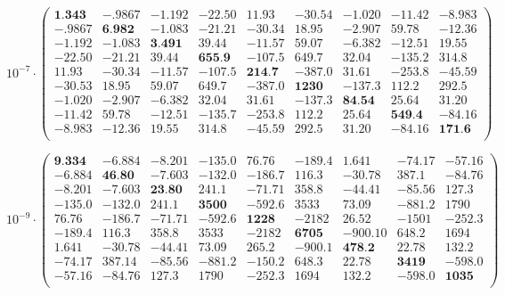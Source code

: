 \documentclass[a4paper,14pt]{extbook}
\begin{document}
\tiny
\begin{equation}\label{cov_1MHz}
10^{-7} \cdot \left(
\begin{array}{ccccccccc}
\textbf{1.343} & -.9867 & -1.192 & -22.50 & 11.93 & -30.54 & -1.020 & -11.42 & -8.983 \\
 -.9867 & \textbf{6.982} & -1.083 & -21.21 & -30.34 & 18.95 & -2.907 & 59.78 & -12.36 \\
 -1.192 & -1.083 & \textbf{3.491} & 39.44 & -11.57 & 59.07 & -6.382 & -12.51 & 19.55 \\
 -22.50 & -21.21 & 39.44 & \textbf{655.9} & -107.5 & 649.7 & 32.04 & -135.2 & 314.8 \\
 11.93 & -30.34 & -11.57 & -107.5 & \textbf{214.7} & -387.0 & 31.61 & -253.8 & -45.59 \\
 -30.53 & 18.95 & 59.07 & 649.7 & -387.0 & \textbf{1230} & -137.3 & 112.2 & 292.5 \\
 -1.020 & -2.907 & -6.382 & 32.04 & 31.61 & -137.3 & \textbf{84.54} & 25.64 & 31.20 \\
 -11.42 & 59.78 & -12.51 & -135.7 & -253.8 & 112.2 & 25.64 & \textbf{549.4} & -84.16 \\
 -8.983 & -12.36 & 19.55 & 314.8 & -45.59 & 292.5 & 31.20 & -84.16 & \textbf{171.6} \\
\end{array}%
\right)
\end{equation}
\normalsize


\tiny
\begin{equation}\label{cov_500kHz_B}
10^{-9}\cdot \left(
\begin{array}{ccccccccc}
 \textbf{9.334} & -6.884 & -8.201 & -135.0 & 76.76 & -189.4 & 1.641 & -74.17 & -57.16 \\
 -6.884& \textbf{46.80} & -7.603 & -132.0 & -186.7 & 116.3 & -30.78 & 387.1 & -84.76 \\
 -8.201 & -7.603 & \textbf{23.80} & 241.1 & -71.71 & 358.8 & -44.41 & -85.56 & 127.3 \\
 -135.0 & -132.0 & 241.1 & \textbf{3500} & -592.6 & 3533 & 73.09 & -881.2 & 1790 \\
 76.76 & -186.7 & -71.71 & -592.6 & \textbf{1228} & -2182 & 26.52 & -1501 & -252.3 \\
 -189.4 & 116.3 & 358.8 & 3533 & -2182 & \textbf{6705} & -900.10 & 648.2 & 1694 \\
 1.641& -30.78 & -44.41 & 73.09 & 265.2 & -900.1 & \textbf{478.2} & 22.78 & 132.2 \\
 -74.17 & 387.14 & -85.56 & -881.2& -150.2 & 648.3 & 22.78 & \textbf{3419} & -598.0 \\
 -57.16 & -84.76 & 127.3& 1790 & -252.3 & 1694 & 132.2 & -598.0 & \textbf{1035} \\
\end{array}%
\right)
\end{equation}
\normalsize
\end{document}
